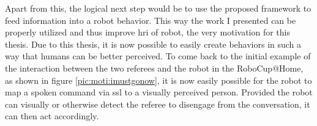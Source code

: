 Apart from this, the logical next step would be to use the proposed framework to feed information into a robot behavior.
This way the work I presented can be properly utilized and thus improve \gls{hri} of robot, the very motivation for this thesis.
Due to this thesis, it is now possible to easily create behaviors in such a way that humans can be better perceived.
To come back to the initial example of the interaction between the two referees and the robot in the RoboCup@Home, as shown in figure \ref{pic:moti:imustgonow}, it is now easily possible for the robot to map a spoken command via \gls{ssl} to a visually perceived person.
Provided the robot can visually or otherwise detect the referee to disengage from the conversation, it can then act accordingly.


